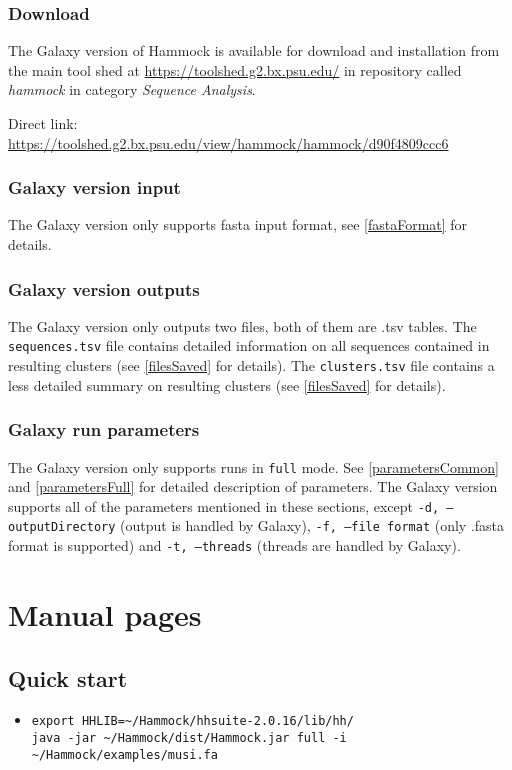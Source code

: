 \documentclass[11pt, a4paper, twoside, titlepage]{article}
\begin{document}
\subsubsection{Download}
\begin{sloppypar}
The Galaxy version of Hammock is available for download and installation from the main tool shed at \mbox{\url{https://toolshed.g2.bx.psu.edu/}} in repository called \emph{hammock} in category \emph{Sequence Analysis}.

Direct link: \mbox{\url{https://toolshed.g2.bx.psu.edu/view/hammock/hammock/d90f4809ccc6}}

\end{sloppypar}

\subsubsection{Galaxy version input}
The Galaxy version only supports fasta input format, see \ref{fastaFormat} for details.

\subsubsection{Galaxy version outputs}
The Galaxy version only outputs two files, both of them are .tsv tables. The \texttt{sequences.tsv} file contains detailed information on all sequences contained in resulting clusters (see \ref{filesSaved} for details). The \texttt{clusters.tsv} file contains a less detailed summary on resulting clusters (see \ref{filesSaved} for details).

\subsubsection{Galaxy run parameters}
The Galaxy version only supports runs in \texttt{full} mode. See \ref{parametersCommon} and \ref{parametersFull} for detailed description of parameters. The Galaxy version supports all of the parameters mentioned in these sections, except \texttt{-d, --outputDirectory} (output is handled by Galaxy),  \texttt{-f, --file format} (only .fasta format is supported) and \texttt{-t, --threads} (threads are handled by Galaxy).


\newpage

\section{Manual pages}
\label{manual}
\subsection{Quick start}
\label{quickStart}
\begin{itemize}
\item[]\verb|export HHLIB=~/Hammock/hhsuite-2.0.16/lib/hh/|\\
\verb|java -jar ~/Hammock/dist/Hammock.jar full -i ~/Hammock/examples/musi.fa|

\end{itemize}
\end{document}
